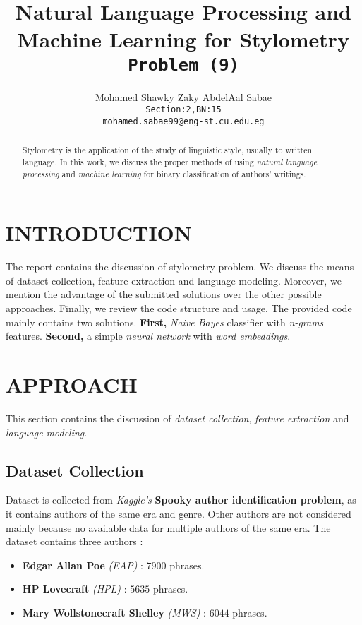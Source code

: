 \documentclass[letterpaper, 10 pt, conference]{ieeeconf}  %
\title{\LARGE \bf
Natural Language Processing and Machine Learning for Stylometry\\
\texttt{Problem (9)}
}
\author{
  Mohamed Shawky Zaky AbdelAal Sabae\\
  \texttt{Section:2,BN:15}\\
  \texttt{mohamed.sabae99@eng-st.cu.edu.eg}
}
\begin{document}
\maketitle
\thispagestyle{empty}
\pagestyle{empty}


\begin{abstract}
Stylometry is the application of the study of linguistic style, usually to written language. In this work, we discuss the proper methods of using \emph{natural language processing} and \emph{machine learning} for binary classification of authors' writings.
\end{abstract}


\section{INTRODUCTION}
The report contains the discussion of stylometry problem. We discuss the means of dataset collection, feature extraction and language modeling. Moreover, we mention the advantage of the submitted solutions over the other possible approaches. Finally, we review the code structure  and usage. The provided code mainly contains two solutions. \textbf{First,} \emph{Naive Bayes} classifier with \emph{n-grams} features. \textbf{Second,} a simple \emph{neural network} with \emph{word embeddings}.


\section{APPROACH}
This section contains the discussion of \emph{dataset collection}, \emph{feature extraction} and \emph{language modeling}.

\subsection{Dataset Collection}
Dataset is collected from \emph{Kaggle's} \textbf{Spooky author identification problem}, as it contains authors of the same era and genre. Other authors are not considered mainly because no available data for multiple authors of the same era. The dataset contains three authors :
\begin{itemize}
    \item \textbf{Edgar Allan Poe} \emph{(EAP)} : $7900$ phrases.
    \item \textbf{HP Lovecraft} \emph{(HPL)} : $5635$ phrases.
    \item \textbf{Mary Wollstonecraft Shelley} \emph{(MWS)} : $6044$ phrases.
\end{itemize}
\end{document}
